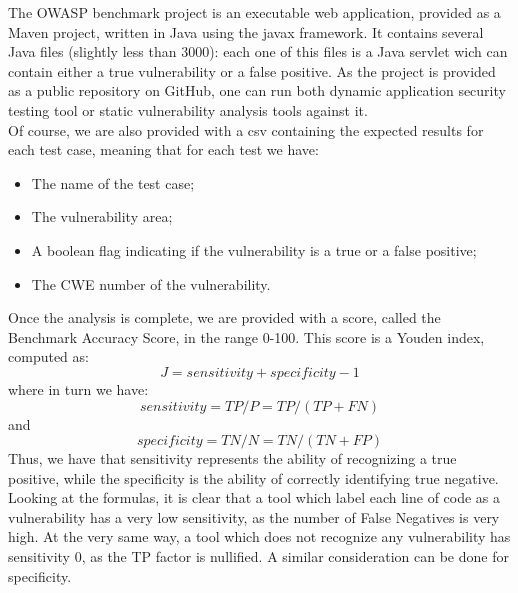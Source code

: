 \documentclass[../Report.tex]{subfiles}
\begin{document}
The OWASP benchmark project is an executable web application, provided as a Maven project, written in Java using the javax framework. It contains several Java files (slightly less than 3000): each one of this files is a Java servlet wich can contain either a true vulnerability or a false positive. As the project is provided as a public repository on GitHub, one can run both dynamic application security testing tool or static vulnerability analysis tools against it. \\
Of course, we are also provided with a csv containing the expected results for each test case, meaning that for each test we have:
\begin{itemize}
	\item The name of the test case;
	\item The vulnerability area;
	\item A boolean flag indicating if the vulnerability is a true or a false positive;
	\item The CWE number of the vulnerability.
\end{itemize}
Once the analysis is complete, we are provided with a score, called the Benchmark Accuracy Score, in the range 0-100. This score is a Youden index, computed as:
\[ J = sensitivity + specificity - 1 \]
where in turn we have:
\[ sensitivity = TP/P = TP/(TP + FN) \]
and
\[ specificity = TN/N = TN/(TN + FP) \]
Thus, we have that sensitivity represents the ability of recognizing a true positive, while the specificity is the ability of correctly identifying true negative. Looking at the formulas, it is clear that a tool which label each line of code as a vulnerability has a very low sensitivity, as the number of False Negatives is very high. At the very same way, a tool which does not recognize any vulnerability has sensitivity 0, as the TP factor is nullified. A similar consideration can be done for specificity.
\end{document}
